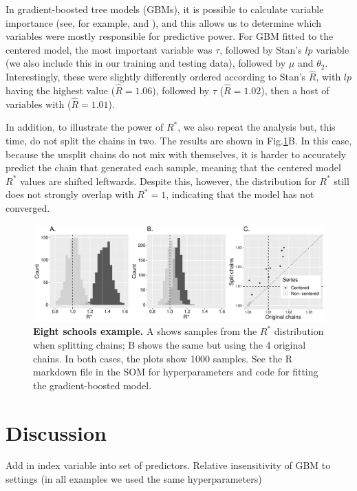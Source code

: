 \documentclass{article}
\begin{document}
In gradient-boosted tree models (GBMs), it is possible to calculate variable importance (see, for example, \cite{friedman2001greedy} and \cite{greenwell2019package}), and this allows us to determine which variables were mostly responsible for predictive power. For GBM fitted to the centered model, the most important variable was $\tau$, followed by Stan's $lp$ variable (we also include this in our training and testing data), followed by $\mu$ and $\theta_2$. Interestingly, these were slightly differently ordered according to Stan's $\hat{R}$, with $lp$ having the highest value ($\hat R = 1.06$), followed by $\tau$ ($\hat R = 1.02$), then a host of variables with ($\hat R = 1.01$).

In addition, to illustrate the power of $R^*$, we also repeat the analysis but, this time, do not split the chains in two. The results are shown in Fig.\ref{fig:eight_schools}B. In this case, because the unsplit chains do not mix with themselves, it is harder to accurately predict the chain that generated each sample, meaning that the centered model $R^*$ values are shifted leftwards. Despite this, however, the distribution for $R^*$ still does not strongly overlap with $R^*=1$, indicating that the model has not converged.

\begin{figure}[h]
	\centerline{\includegraphics[width=1.0\textwidth]{../output/eight_schools.pdf}}
	\caption{\textbf{Eight schools example.} A shows samples from the $R^*$ distribution when splitting chains; B shows the same but using the 4 original chains. In both cases, the plots show 1000 samples. See the R markdown file in the SOM for hyperparameters and code for fitting the gradient-boosted model.}
	\label{fig:eight_schools}
\end{figure}

\section{Discussion}
Add in index variable into set of predictors.
Relative insensitivity of GBM to settings (in all examples we used the same hyperparameters)



	

 
	
\end{document}
